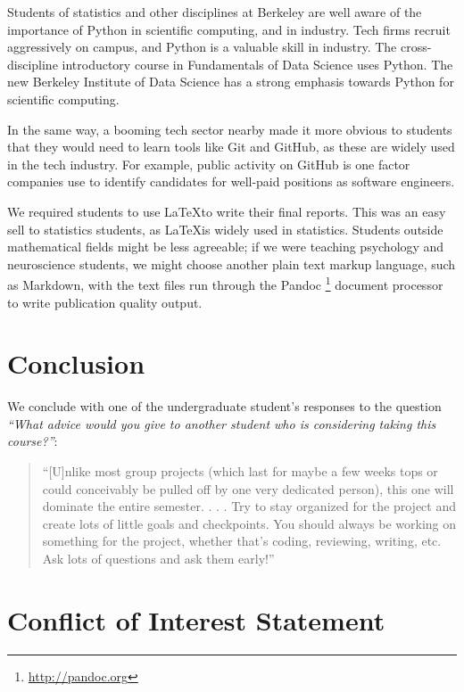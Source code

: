 
Students of statistics and other disciplines at Berkeley are well aware of the
importance of Python in scientific computing, and in industry.  Tech firms
recruit aggressively on campus, and Python is a valuable skill in industry.
The cross-discipline introductory course in Fundamentals of Data Science uses
Python. The new Berkeley Institute of Data Science has a strong emphasis
towards Python for scientific computing.

In the same way, a booming tech sector nearby made it more obvious to students
that they would need to learn tools like Git and GitHub, as these are widely
used in the tech industry.  For example, public activity on GitHub is one
factor companies use to identify candidates for well-paid positions as
software engineers.

We required students to use \LaTeX to write their final reports.  This was an
easy sell to statistics students, as \LaTeX is widely used in statistics.
Students outside mathematical fields might be less agreeable; if we were
teaching psychology and neuroscience students, we might choose
another plain text markup language, such as Markdown, with the text files run
through the Pandoc \footnote{\url{http://pandoc.org}} document processor to
write publication quality output.

\section{Conclusion}\label{conclusion}

We conclude with one of the undergraduate student's responses to the question
\emph{``What advice would you give to another student who is considering taking this course?''}:
\begin{quotation}
``[U]nlike most group projects (which last for maybe a few weeks tops or
could conceivably be pulled off by one very dedicated person), this one will
dominate the entire semester. . . . Try to stay organized for the project and
create lots of little goals and checkpoints. You should always be working on
something for the project, whether that's coding, reviewing, writing, etc. Ask
lots of questions and ask them early!''
\end{quotation}

\section*{Conflict of Interest Statement}

